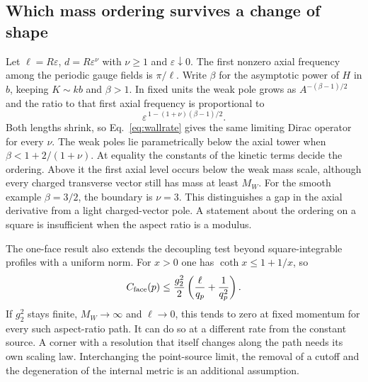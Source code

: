 \documentclass[aps,prd,reprint,onecolumn,nofootinbib,amsmath,amssymb]{revtex4-2}
\begin{document}
\subsection{Which mass ordering survives a change of shape}
Let $\ell=R\varepsilon$, $d=R\varepsilon^\nu$ with $\nu\ge1$ and $\varepsilon\downarrow0$. The first nonzero axial frequency among the periodic gauge fields is $\pi/\ell$. Write $\beta$ for the asymptotic power of $H$ in $b$, keeping $K\sim k b$ and $\beta>1$. In fixed units the weak pole grows as $A^{-(\beta-1)/2}$ and the ratio to that first axial frequency is proportional to
\begin{equation}
 \varepsilon^{\,1-(1+\nu)(\beta-1)/2}.
\end{equation}
Both lengths shrink, so Eq.~\eqref{eq:wallrate} gives the same limiting Dirac operator for every $\nu$. The weak poles lie parametrically below the axial tower when $\beta<1+2/(1+\nu)$. At equality the constants of the kinetic terms decide the ordering. Above it the first axial level occurs below the weak mass scale, although every charged transverse vector still has mass at least $M_W$. For the smooth example $\beta=3/2$, the boundary is $\nu=3$. This distinguishes a gap in the axial derivative from a light charged-vector pole. A statement about the ordering on a square is insufficient when the aspect ratio is a modulus.

The one-face result also extends the decoupling test beyond square-integrable profiles with a uniform norm. For $x>0$ one has $\coth x\le1+1/x$, so
\begin{equation}
 C_{\rm face}(p)\le\frac{g_2^2}{2}
        \left(\frac{\ell}{q_p}+\frac{1}{q_p^2}\right).
\end{equation}
If $g_2^2$ stays finite, $M_W\to\infty$ and $\ell\to0$, this tends to zero at fixed momentum for every such aspect-ratio path. It can do so at a different rate from the constant source. A corner with a resolution that itself changes along the path needs its own scaling law. Interchanging the point-source limit, the removal of a cutoff and the degeneration of the internal metric is an additional assumption.
\end{document}
